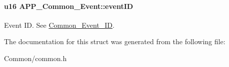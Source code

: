 \paragraph[{\texorpdfstring{event\+ID}{eventID}}]{\setlength{\rightskip}{0pt plus 5cm}u16 A\+P\+P\+\_\+\+Common\+\_\+\+Event\+::event\+ID}\hypertarget{struct_a_p_p___common___event_a701fbf4ff07a1083534d2bee164def3c}{}\label{struct_a_p_p___common___event_a701fbf4ff07a1083534d2bee164def3c}
Event ID. See \hyperlink{group___a_p_p___c_o_m_m_o_n_gac766f0efda77d92351cdb26d5b2c0731}{Common\+\_\+\+Event\+\_\+\+ID}. 

The documentation for this struct was generated from the following file\+:\begin{DoxyCompactItemize}
\item 
Common/common.\+h\end{DoxyCompactItemize}
